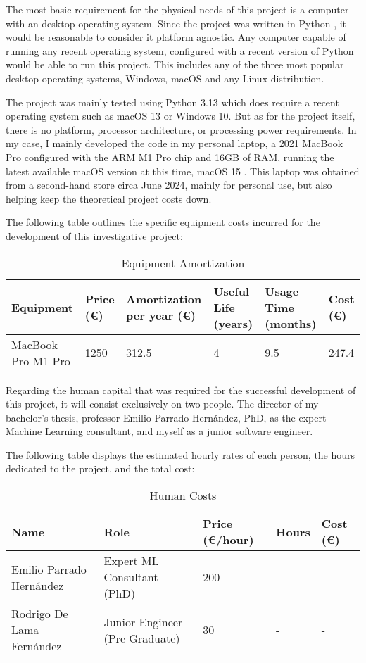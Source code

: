 \documentclass[12pt]{report} %
\begin{document}
The most basic requirement for the physical needs of this project is a computer with an desktop operating system. Since the project was written in Python \cite{python}, it would be reasonable to consider it platform agnostic. Any computer capable of running any recent operating system, configured with a recent version of Python would be able to run this project. This includes any of the three most popular desktop operating systems, Windows, macOS and any Linux distribution.

The project was mainly tested using Python 3.13 \cite{python3.13} which does require a recent operating system such as macOS 13 or Windows 10. But as for the project itself, there is no platform, processor architecture, or processing power requirements. In my case, I mainly developed the code in my personal laptop, a 2021 MacBook Pro configured with the ARM M1 Pro chip and 16GB of RAM, running the latest available macOS version at this time, macOS 15 \cite{macos}. This laptop was obtained from a second-hand store circa June 2024, mainly for personal use, but also helping keep the theoretical project costs down.

The following table outlines the specific equipment costs incurred for the development of this investigative project:
\begin{table}[H]
	\caption{Equipment Amortization}
	\centering
	\begin{tabular}{|P{2.8cm}|P{1.8cm}|P{2.5cm}|P{1.5cm}|P{2cm}|P{1.5cm}|}
		\hline
		\textbf{Equipment} & \textbf{Price (€)} & \textbf{Amortization per year (€)} & \textbf{Useful Life (years)} & \textbf{Usage Time (months)} & \textbf{Cost (€)} \\
		\hline
		MacBook Pro M1 Pro & 1250 & 312.5 & 4 & 9.5 & 247.4 \\
		\hline
	\end{tabular}
\end{table}

Regarding the human capital that was required for the successful development of this project, it will consist exclusively on two people. The director of my bachelor's thesis, professor Emilio Parrado Hernández, PhD, as the expert Machine Learning consultant, and myself as a junior software engineer.

The following table displays the estimated hourly rates of each person, the hours dedicated to the project, and the total cost:
            
\begin{table}[H]
	\caption{Human Costs}
	\centering
	\begin{tabular}{|P{4cm}|P{3.5cm}|P{1.8cm}|P{1.5cm}|P{1.5cm}|}
		\hline
		\textbf{Name} & \textbf{Role} & \textbf{Price (€/hour)} & \textbf{Hours} & \textbf{Cost (€)} \\
		\hline
		Emilio Parrado Hernández & Expert ML Consultant (PhD) & 200 & - & - \\
		\hline
		Rodrigo De Lama Fernández & Junior Engineer (Pre-Graduate) & 30 & - & - \\
		\hline
	\end{tabular}
\end{table}
\end{document}
